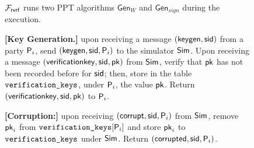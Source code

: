 
\newcommand{\Gen}{\ensuremath{\mathsf{Gen}}}

\newcommand{\anonymouskeymap}{\ensuremath{\mathtt{anonymous\_key\_map}}}
\newcommand{\anonymouskeylist}{\mathcal{W}}
\renewcommand{\sim}{\simulator}

\begin{figure}
\footnotesize 
\begin{tcolorbox}[left=2pt,right=2pt]
	{  $ \mathcal{F}_{\textsf{rvrf}} $ runs two PPT algorithms $ \Gen_W$ and $\Gen_{sign} $ during the execution.
	
		
				
			\textbf{[Key Generation.]} upon receiving a message $(\mathsf{keygen}, \textsf{sid})$ from a party $\mathsf{P}_i$, send $(\mathsf{keygen}, \textsf{sid}, \mathsf{P}_i)$ to the simulator $\mathsf{Sim}$.
			Upon receiving a message $(\mathsf{verificationkey}, \textsf{sid}, \mathsf{pk})$ from $\mathsf{Sim}$, verify that $\mathsf{pk}$ has not been recorded before for $ \textsf{sid} $; then, store in the table $\texttt{verification\_keys}$, under $\mathsf{P}_i$, the value $\mathsf{pk}$.
			Return $(\mathsf{verificationkey}, \textsf{sid}, \mathsf{pk})$ to $ \mathsf{P}_i$.
				
				
			\textbf{[Corruption:] } 
			upon receiving $ (\mathsf{corrupt}, \textsf{sid}, \mathsf{P}_i) $ from $ \mathsf{Sim} $, remove $ \mathsf{pk}_i $ from $ \texttt{verification\_keys}[\mathsf{P}_i] $ and store $ \mathsf{pk}_i $ to $ \texttt{verification\_keys} $ under $ \sim $. Return $ (\mathsf{corrupted}, \textsf{sid},\mathsf{P}_i) $.
			
}
\end{tcolorbox}
\end{figure}
